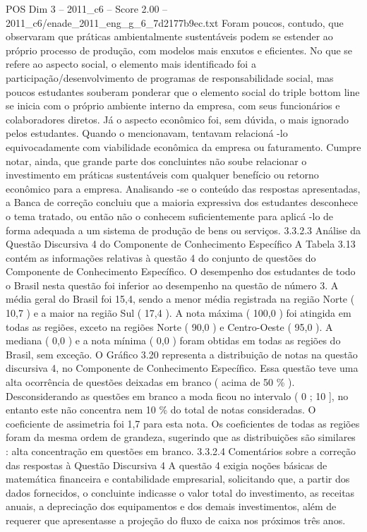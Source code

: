\begin{textsample}{POS Dim 3 – 2011\_c6 – Score 2.00 – 2011\_c6/enade\_2011\_eng\_g\_6\_7d2177b9ec.txt}
Foram poucos, contudo, que observaram que práticas ambientalmente sustentáveis podem se estender ao próprio processo de produção, com modelos mais enxutos e eficientes.
No que se refere ao aspecto social, o elemento mais identificado foi a participação/desenvolvimento de programas de responsabilidade social, mas poucos estudantes souberam ponderar que o elemento social do triple bottom line se inicia com o próprio ambiente interno da empresa, com seus funcionários e colaboradores diretos.
Já o aspecto econômico foi, sem dúvida, o mais ignorado pelos estudantes.
Quando o mencionavam, tentavam relacioná -lo equivocadamente com viabilidade econômica da empresa ou faturamento.
Cumpre notar, ainda, que grande parte dos concluintes não soube relacionar o investimento em práticas sustentáveis com qualquer benefício ou retorno econômico para a empresa.
Analisando -se o conteúdo das respostas apresentadas, a Banca de correção concluiu que a maioria expressiva dos estudantes desconhece o tema tratado, ou então não o conhecem suficientemente para aplicá -lo de forma adequada a um sistema de produção de bens ou serviços. 3.3.2.3 Análise da Questão Discursiva 4 do Componente de Conhecimento Específico A Tabela 3.13 contém as informações relativas à questão 4 do conjunto de questões do Componente de Conhecimento Específico.
O desempenho dos estudantes de todo o Brasil nesta questão foi inferior ao desempenho na questão de número 3.
A média geral do Brasil foi 15,4, sendo a menor média registrada na região Norte ( 10,7 ) e a maior na região Sul ( 17,4 ).
A nota máxima ( 100,0 ) foi atingida em todas as regiões, exceto na regiões Norte ( 90,0 ) e Centro-Oeste ( 95,0 ).
A mediana ( 0,0 ) e a nota mínima ( 0,0 ) foram obtidas em todas as regiões do Brasil, sem exceção.
O Gráfico 3.20 representa a distribuição de notas na questão discursiva 4, no Componente de Conhecimento Específico.
Essa questão teve uma alta ocorrência de questões deixadas em branco ( acima de 50 \% ).
Desconsiderando as questões em branco a moda ficou no intervalo ( 0 ; 10 ], no entanto este não concentra nem 10 \% do total de notas consideradas.
O coeficiente de assimetria foi 1,7 para esta nota.
Os coeficientes de todas as regiões foram da mesma ordem de grandeza, sugerindo que as distribuições são similares : alta concentração em questões em branco. 3.3.2.4 Comentários sobre a correção das respostas à Questão Discursiva 4 A questão 4 exigia noções básicas de matemática financeira e contabilidade empresarial, solicitando que, a partir dos dados fornecidos, o concluinte indicasse o valor total do investimento, as receitas anuais, a depreciação dos equipamentos e dos demais investimentos, além de requerer que apresentasse a projeção do fluxo de caixa nos próximos três anos.

\end{textsample}
